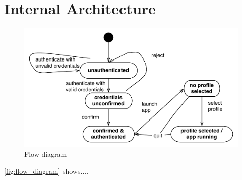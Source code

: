 \section{Internal Architecture}



\begin{figure}[h]
	\centering
	\includegraphics[width=1\textwidth]{gfx/flow-diagram2.pdf}
	\caption{Flow diagram}
	\label{fig:flow_diagram}
\end{figure}

\autoref{fig:flow_diagram} shows.... 